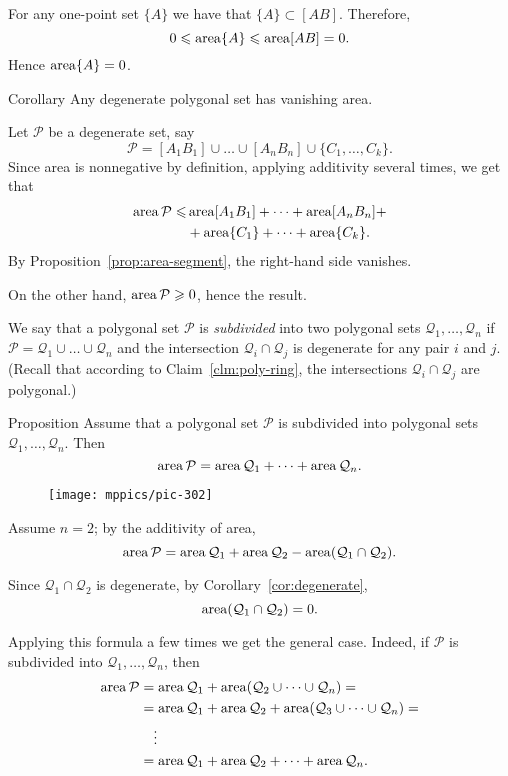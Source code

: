 {For any one-point set $\{A\}$ 
we have that $\{A\}\subset [AB]$.
Therefore, 
\[0\leqslant \mathop{\rm area}\nolimits\{A\}\leqslant \mathop{\rm area}\nolimits[AB]=0.\]
Hence $\mathop{\rm area}\nolimits\{A\}=0$.
\qeds

\begin{thm}{Corollary}\label{cor:degenerate}
Any degenerate polygonal set has vanishing area.
\end{thm}

Let $\mathcal P$ be a degenerate set,
say
\[\mathcal{P}=[A_1B_1]\cup\dots\cup[A_nB_n]\cup\{C_1,\dots,C_k\}.\]
Since area is nonnegative by definition, applying additivity several times, we get that
\begin{align*}
\mathop{\rm area}\nolimits\mathcal{P}\leqslant
& \mathop{\rm area}\nolimits[A_1B_1]+\dots+\mathop{\rm area}\nolimits[A_nB_n]+
\\
&+\mathop{\rm area}\nolimits\{C_1\}+\dots+\mathop{\rm area}\nolimits\{C_k\}.
\end{align*}
By Proposition~\ref{prop:area-segment}, the right-hand side vanishes.

On the other hand, 
$\mathop{\rm area}\nolimits\mathcal{P}\geqslant 0$,
hence the result.
\qeds

We say that a polygonal set $\mathcal{P}$ is \emph{subdivided} 
into two polygonal sets $\mathcal{Q}_1,\dots,\mathcal{Q}_n$ 
if $\mathcal{P}=\mathcal{Q}_1\cup\dots\cup \mathcal{Q}_n$ 
and the intersection $\mathcal{Q}_i\cap\mathcal{Q}_j$ is degenerate for any pair $i$ and $j$.
(Recall that according to Claim~\ref{clm:poly-ring},
the intersections $\mathcal{Q}_i\cap\mathcal{Q}_j$ are polygonal.)

\begin{thm}{Proposition}\label{prop:subdivision}
Assume that a polygonal set $\mathcal{P}$ is subdivided into polygonal sets $\mathcal{Q}_1,\dots,\mathcal{Q}_n$.
Then 
\[\mathop{\rm area}\nolimits\mathcal{P}=\mathop{\rm area}\nolimits\mathcal{Q}_1+\dots+\mathop{\rm area}\nolimits\mathcal{Q}_n.\]

\end{thm}

\begin{wrapfigure}{o}{26 mm}
\vskip-4mm
\centering
\texttt{[image: mppics/pic-302]}
\end{wrapfigure}

Assume $n=2$; by the additivity of area,
\[\mathop{\rm area}\nolimits\mathcal{P}=\mathop{\rm area}\nolimits\mathcal{Q}_1+\mathop{\rm area}\nolimits\mathcal{Q}_2-\mathop{\rm area}\nolimits(\mathcal{Q}_1\cap\mathcal{Q}_2).\]

Since $\mathcal{Q}_1\cap\mathcal{Q}_2$ is degenerate,
by Corollary~\ref{cor:degenerate},
\[\mathop{\rm area}\nolimits(\mathcal{Q}_1\cap\mathcal{Q}_2)=0.\]

Applying this formula a few times we get the general case.
Indeed, if $\mathcal{P}$ is subdivided into $\mathcal{Q}_1,\dots,\mathcal{Q}_n$, then
\begin{align*}
\mathop{\rm area}\nolimits\mathcal{P}&=\mathop{\rm area}\nolimits\mathcal{Q}_1+\mathop{\rm area}\nolimits(\mathcal{Q}_2\cup\dots\cup\mathcal{Q}_n)=
\\
&=\mathop{\rm area}\nolimits\mathcal{Q}_1+\mathop{\rm area}\nolimits \mathcal{Q}_2+\mathop{\rm area}\nolimits( \mathcal{Q}_3\cup\dots\cup\mathcal{Q}_n)=
\\
&\ \ \ \vdots
\\
&=\mathop{\rm area}\nolimits\mathcal{Q}_1+\mathop{\rm area}\nolimits \mathcal{Q}_2+\dots+\mathop{\rm area}\nolimits\mathcal{Q}_n.
\end{align*}
\qedsf

}
